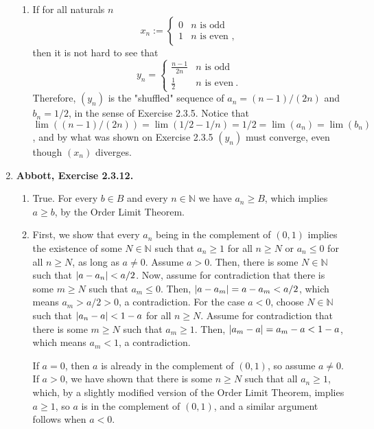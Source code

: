 \documentclass{article}
\DeclarePairedDelimiter\abs{\lvert}{\rvert}
\newcommand{\N}{\mathbb{N}}
\newcommand{\exc}[2][Abbott]{\item \textbf{#1, Exercise #2.}}
\begin{document}
\begin{enumerate}
\begin{enumerate}
		\item If for all naturals $n$ \begin{equation*}
		      x_n := \begin{cases}
		      0 & n \text{ is odd} \\
		      1 & n \text{ is even} \text{ ,}
		\end{cases}
		\end{equation*} then it is not hard to see that \begin{equation*}
		y_n = \begin{cases}
		\frac{n-1}{2n} & n \text{ is odd} \\
		\frac{1}{2} & n \text{ is even} ~ .
		\end{cases}
		\end{equation*} Therefore, $(y_n)$ is the "shuffled" sequence of $a_n = (n-1)/(2n)$ and $b_n = 1/2$, in the sense of Exercise 2.3.5. Notice that $\lim((n-1)/(2n)) = \lim(1/2 - 1/n) = 1/2 = \lim(a_n) = \lim(b_n)$, and by what was shown on Exercise 2.3.5 $(y_n)$ must converge, even though $(x_n)$ diverges.
	\end{enumerate}
				 
	\exc{2.3.12}
				 
	\begin{enumerate}
		\item True. For every $b \in B$ and every $n \in \N$ we have $a_n \geq B$, which implies $a \geq b$, by the Order Limit Theorem.
		      		      		      	     
		\item First, we show that every $a_n$ being in the complement of $(0, 1)$ implies the existence of some $N \in \N$ such that $a_n \geq 1$ for all $n \geq N$ or $a_n \leq 0$ for all $n \geq N$, as long as $a \neq 0$. Assume $a > 0$. Then, there is some $N \in \N$ such that $\abs{a-a_n} < a/2$. Now, assume for contradiction that there is some $m \geq N$ such that $a_m \leq 0$. Then, $\abs{a-a_m} = a-a_m < a/2$, which means $a_m > a/2 > 0$, a contradiction. For the case $a < 0$, choose $N \in \N$ such that $\abs{a_n-a} < 1-a$ for all $n \geq N$. Assume for contradiction that there is some $m \geq N$ such that $a_m \geq 1$. Then, $\abs{a_m-a} = a_m-a < 1-a$, which means $a_m < 1$, a contradiction. 
		      		      		      	     
		      If $a = 0$, then $a$ is already in the complement of $(0, 1)$, so assume $a \neq 0$. If $a > 0$, we have shown that there is some $n \geq N$ such that all $a_n \geq 1$, which, by a slightly modified version of the Order Limit Theorem, implies $a \geq 1$, so $a$ is in the complement of $(0, 1)$, and a similar argument follows when $a < 0$.
		      		      		      	     

\end{enumerate}
\end{enumerate}
\end{document}
